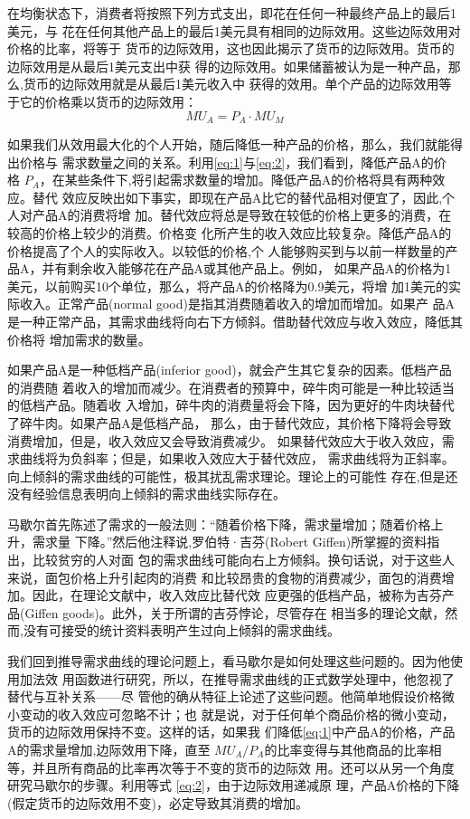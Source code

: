 在均衡状态下，消费者将按照下列方式支出，即花在任何一种最终产品上的最后1美元，与
花在任何其他产品上的最后1美元具有相同的边际效用。这些边际效用对价格的比率，将等于
货币的边际效用，这也因此揭示了货币的边际效用。货币的边际效用是从最后1美元支出中获
得的边际效用。如果储蓄被认为是一种产品，那么,货币的边际效用就是从最后1美元收入中
获得的效用。单个产品的边际效用等于它的价格乘以货币的边际效用：
\begin{equation}
  \label{eq:2}
  MU_A = P_A \cdot MU_M
\end{equation}

如果我们从效用最大化的个人开始，随后降低一种产品的价格，那么，我们就能得出价格与
需求数量之间的关系。利用\cref{eq:1}与\cref{eq:2}，我们看到，降低产品A的价
格 $P_A$，在某些条件下,将引起需求数量的增加。降低产品A的价格将具有两种效应。替代
效应反映出如下事实，即现在产品A比它的替代品相对便宜了，因此,个人对产品A的消费将增
加。替代效应将总是导致在较低的价格上更多的消费，在较高的价格上较少的消费。价格变
化所产生的收入效应比较复杂。降低产品A的价格提高了个人的实际收入。以较低的价格,个
人能够购买到与以前一样数量的产品A，并有剩余收入能够花在产品A或其他产品上。例如，
如果产品A的价格为1美元，以前购买10个单位，那么，将产品A的价格降为0.9美元，将增
加1美元的实际收入。正常产品(normal good)是指其消费随着收入的增加而增加。如果产
品A是一种正常产品，其需求曲线将向右下方倾斜。借助替代效应与收入效应，降低其价格将
增加需求的数量。

如果产品A是一种低档产品(inferior good)，就会产生其它复杂的因素。低档产品的消费随
着收入的增加而减少。在消费者的预算中，碎牛肉可能是一种比较适当的低档产品。随着收
入增加，碎牛肉的消费量将会下降，因为更好的牛肉块替代了碎牛肉。如果产品A是低档产品，
那么，由于替代效应，其价格下降将会导致消费增加，但是，收入效应又会导致消费减少。
如果替代效应大于收入效应，需求曲线将为负斜率；但是，如果收入效应大于替代效应，
需求曲线将为正斜率。向上倾斜的需求曲线的可能性，极其扰乱需求理论。理论上的可能性
存在,但是还没有经验信息表明向上倾斜的需求曲线实际存在。

马歇尔首先陈述了需求的一般法则：“随着价格下降，需求量增加；随着价格上升，需求量
下降。”然后他注释说,罗伯特·吉芬(Robert Giffen)所掌握的资料指出，比较贫穷的人对面
包的需求曲线可能向右上方倾斜。换句话说，对于这些人来说，面包价格上升引起肉的消费
和比较昂贵的食物的消费减少，面包的消费增加。因此，在理论文献中，收入效应比替代效
应更强的低档产品，被称为吉芬产品(Giffen goods)。此外，关于所谓的吉芬悖论，尽管存在
相当多的理论文献，然而,没有可接受的统计资料表明产生过向上倾斜的需求曲线。

我们回到推导需求曲线的理论问题上，看马歇尔是如何处理这些问题的。因为他使用加法效
用函数进行研究，所以，在推导需求曲线的正式数学处理中，他忽视了替代与互补关系——尽
管他的确从特征上论述了这些问题。他简单地假设价格微小变动的收入效应可忽略不计；也
就是说，对于任何单个商品价格的微小变动，货币的边际效用保持不变。这样的话，如果我
们降低\cref{eq:1}中产品A的价格，产品A的需求量增加,边际效用下降，直至 $MU_A /
P_A$的比率变得与其他商品的比率相等，并且所有商品的比率再次等于不变的货币的边际效
用。还可以从另一个角度研究马歇尔的步骤。利用等式 \cref{eq:2}，由于边际效用递减原
理，产品A价格的下降(假定货币的边际效用不变)，必定导致其消费的增加。

